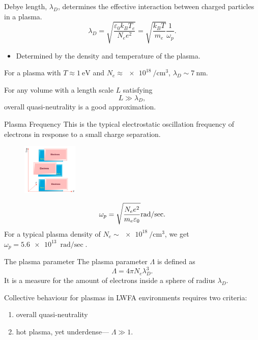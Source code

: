 \documentclass[final]{beamer}
\begin{document}
\begin{frame}{\debye}
  Debye length, $\lambda_D$, determines the effective interaction between charged particles in a plasma.
  \begin{equation*}
\lambda_D=\sqrt{\frac{\varepsilon_0 k_B T_e}{N_e e^2}}=\sqrt{\frac{k_B T}{m_e}}\frac{1}{\omega_p}.
\end{equation*}
\begin{itemize}
  \item Determined by the density and temperature of the plasma.
\end{itemize}
For a plasma with $T\approx \SI{1}{\eV}$ and $N_e\approx \SI{e18}{\per\cubic\cm}$, $\lambda_D\sim \SI{7}{\nm}$.

For any volume with a length scale $L$ satisfying 
\begin{equation*}
L \gg \lambda_D,
\label{eq:quasiNeutrality}
\end{equation*}
overall quasi-neutrality is a good approximation.
\end{frame}
\newcommand{\plasmafreq}{Plasma Frequency}
\begin{frame}{\plasmafreq}
This is the typical electrostatic oscillation frequency of electrons in response to a small charge separation.
\begin{figure}
  \includegraphics[width=100px]{figures/plasma_oscillation.PNG}
\end{figure}
\begin{equation*}
		\omega_p=\sqrt{\frac{N_e e^2}{m_e \varepsilon_0}}\si[per-mode=fraction]{\radian\per\sec}.\label{eq:plasma-frequency}
\end{equation*}
For a typical plasma density of $N_e \sim \SI{e18}{\per\cubic\cm}$, we get $\omega_p=\SI{5.6e13}{\radian\per\sec}$.%
\end{frame}
\begin{frame}{The plasma parameter}
The plasma parameter $\Lambda$ is defined as
\begin{equation*}
  \Lambda=4\pi N_e \lambda_D ^3.
\end{equation*}
It is a measure for the amount of electrons inside a sphere of radius $\lambda_D$.

Collective behaviour for plasmas in LWFA environments requires two criteria:
\begin{enumerate}
  \item overall quasi-neutrality
  \item hot plasma, yet underdense\footnotemark --- $\Lambda \gg 1$.
\end{enumerate}
\end{frame}
\end{document}
